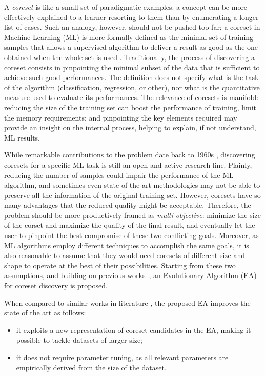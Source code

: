 \documentclass{article}
\begin{document}
A \emph{coreset} is like a small set of paradigmatic examples: a concept can be more effectively explained to a learner resorting to them than by enumerating a longer list of cases. Such an analogy, however, should not be pushed too far: a coreset in Machine Learning (ML) is more formally defined as the minimal set of training samples that allows a supervised algorithm to deliver a result as good as the one obtained when the whole set is used \cite{bachem2017practical}. Traditionally, the process of discovering a coreset consists in pinpointing the minimal subset of the data that is sufficient to achieve such good performances. The definition does not specify what is the task of the algorithm (classification, regression, or other), nor what is the quantitative measure used to evaluate its performances. The relevance of coresets is manifold: reducing the size of the training set can boost the performance of training, limit the memory requirements; and pinpointing the key elements required may provide an insight on the internal process, helping to explain, if not understand, ML results. 

While remarkable contributions to the problem date back to 1960s \cite{Efroymson1960}, discovering coresets for a specific ML task is still an open and active research line. Plainly, reducing the number of samples could impair the performance of the ML algorithm, and sometimes even state-of-the-art methodologies may not be able to preserve all the information of the original training set. However, coresets have so many advantages that the reduced quality might be acceptable. Therefore, the problem should be more productively framed as \emph{multi-objective}: minimize the size of the corset and maximize the quality of the final result, and eventually let the user to pinpoint the best compromise of these two conflicting goals. Moreover, as ML algorithms employ different techniques to accomplish the same goals, it is also reasonable to assume that they would need coresets of different size and shape to operate at the best of their possibilities. Starting from these two assumptions, and building on previous works~\cite{barbiero2019fundamental,barbiero2019making,barbiero2019evolutionary}, an Evolutionary Algorithm (EA) for coreset discovery is proposed.


When compared to similar works in literature \cite{barbiero2019evolutionary}, the proposed EA improves the state of the art as follows:
\begin{itemize}
    \item it exploits a new representation of coreset candidates in the EA, making it possible to tackle datasets of larger size;
    \item it does not require parameter tuning, as all relevant parameters are empirically derived from the size of the dataset.
\end{itemize}
\end{document}
